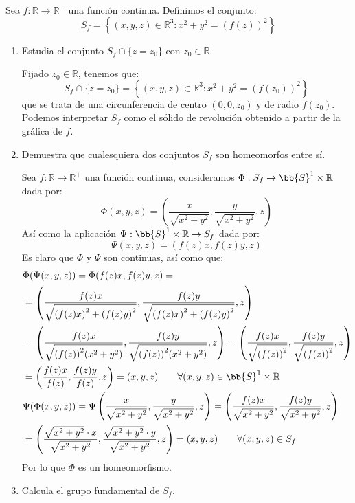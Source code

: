 \begin{ejercicio}
    Sea $f:\mathbb{R}\to \mathbb{R}^+$ una función continua. Definimos el conjunto:
    \begin{equation*}
        S_f = \left\{(x,y,z)\in \mathbb{R}^3: x^2+y^2 = {(f(z))}^{2}\right\}
    \end{equation*}
    \begin{enumerate}[label=\alph*)]
        \item Estudia el conjunto $S_f\cap \{z=z_0\}$ con $z_0\in \mathbb{R}$.

            Fijado $z_0\in \mathbb{R}$, tenemos que:
            \begin{equation*}
                S_f \cap \{z=z_0\} = \left\{(x,y,z)\in \mathbb{R}^3 : x^2+y^2 = {(f(z_0))}^{2}\right\}
            \end{equation*}
            que se trata de una circunferencia de centro $(0,0,z_0)$ y de radio $f(z_0)$. Podemos interpretar $S_f$ como el sólido de revolución obtenido a partir de la gráfica de $f$.
        \item Demuestra que cualesquiera dos conjuntos $S_f$ son homeomorfos entre sí.

            Sea $f:\mathbb{R}\to \mathbb{R}^+$ una función continua, consideramos $\Phi:S_f\to \bb{S}^1\times \mathbb{R}$ dada por:
            \begin{equation*}
                \Phi(x,y,z) = \left(\frac{x}{\sqrt{x^2+y^2}}, \frac{y}{\sqrt{x^2+y^2}}, z\right)
            \end{equation*}
            Así como la aplicación $\Psi:\bb{S}^1\times \mathbb{R}\to S_f$ dada por:
            \begin{equation*}
                \Psi(x,y,z) = (f(z)x, f(z)y, z)
            \end{equation*}
            Es claro que $\Phi$ y $\Psi$ son continuas, así como que:
            \begin{align*}
                &\Phi(\Psi(x,y,z)) = \Phi(f(z)x, f(z)y, z) = \\ 
                &=\left(\frac{f(z)x}{\sqrt{{(f(z)x)}^{2} + {(f(z)y)}^{2}}}, \frac{f(z)y}{\sqrt{{(f(z)x)}^{2} + {(f(z)y)}^{2}}}, z\right)\\
                &=\left(\frac{f(z)x}{\sqrt{{(f(z))}^{2}(x^2+y^2)}}, \frac{f(z)y}{\sqrt{{(f(z))}^{2}(x^2+y^2)}}, z\right) =\left(\frac{f(z)x}{\sqrt{{(f(z))}^{2}}}, \frac{f(z)y}{\sqrt{{(f(z))}^{2}}}, z\right)\\
                &=\left(\frac{f(z)x}{f(z)}, \frac{f(z)y}{f(z)}, z\right) = (x,y,z) \qquad \forall (x,y,z)\in \bb{S}^1\times \mathbb{R} \\
                &\Psi(\Phi(x,y,z)) = \Psi\left(\frac{x}{\sqrt{x^2+y^2}}, \frac{y}{\sqrt{x^2+y^2}}, z\right)= \left(\frac{f(z)x}{\sqrt{x^2+y^2}}, \frac{f(z)y}{\sqrt{x^2+y^2}}, z\right) \\
                &= \left(\frac{\sqrt{x^2+y^2}\cdot x}{\sqrt{x^2+y^2}}, \frac{\sqrt{x^2+y^2}\cdot y}{\sqrt{x^2+y^2}}, z\right)  = (x,y,z) \qquad \forall (x,y,z)\in S_f
            \end{align*}
            Por lo que $\Phi$ es un homeomorfismo.
        \item Calcula el grupo fundamental de $S_f$.


\end{enumerate}
\end{ejercicio}

